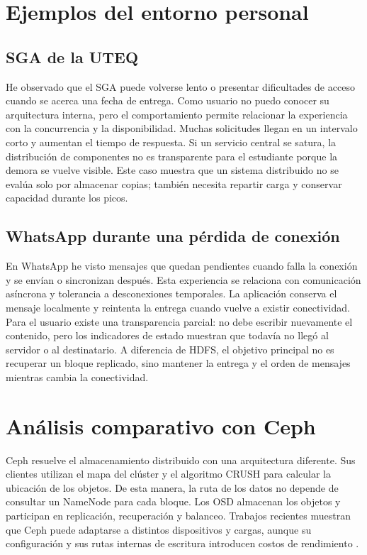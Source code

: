 \documentclass[12pt,a4paper]{article}
\begin{document}
\section{Ejemplos del entorno personal}

\subsection{SGA de la UTEQ}

He observado que el SGA puede volverse lento o presentar dificultades de acceso cuando se acerca una fecha de entrega. Como usuario no puedo conocer su arquitectura interna, pero el comportamiento permite relacionar la experiencia con la concurrencia y la disponibilidad. Muchas solicitudes llegan en un intervalo corto y aumentan el tiempo de respuesta. Si un servicio central se satura, la distribución de componentes no es transparente para el estudiante porque la demora se vuelve visible. Este caso muestra que un sistema distribuido no se evalúa solo por almacenar copias; también necesita repartir carga y conservar capacidad durante los picos.

\subsection{WhatsApp durante una pérdida de conexión}

En WhatsApp he visto mensajes que quedan pendientes cuando falla la conexión y se envían o sincronizan después. Esta experiencia se relaciona con comunicación asíncrona y tolerancia a desconexiones temporales. La aplicación conserva el mensaje localmente y reintenta la entrega cuando vuelve a existir conectividad. Para el usuario existe una transparencia parcial: no debe escribir nuevamente el contenido, pero los indicadores de estado muestran que todavía no llegó al servidor o al destinatario. A diferencia de HDFS, el objetivo principal no es recuperar un bloque replicado, sino mantener la entrega y el orden de mensajes mientras cambia la conectividad.

\section{Análisis comparativo con Ceph}

Ceph resuelve el almacenamiento distribuido con una arquitectura diferente. Sus clientes utilizan el mapa del clúster y el algoritmo CRUSH para calcular la ubicación de los objetos. De esta manera, la ruta de los datos no depende de consultar un NameNode para cada bloque. Los OSD almacenan los objetos y participan en replicación, recuperación y balanceo. Trabajos recientes muestran que Ceph puede adaptarse a distintos dispositivos y cargas, aunque su configuración y sus rutas internas de escritura introducen costos de rendimiento \cite{ha2025zceph,vondra2026benchmark}.
\end{document}
